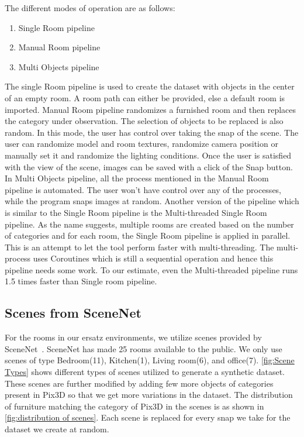 The different modes of operation are as follows:
\begin{enumerate}
\item Single Room pipeline
\item Manual Room pipeline
\item Multi Objects pipeline
\end{enumerate}

The single Room pipeline is used to create the dataset with objects in the center of an empty room.
A room path can either be provided, else a default room is imported.
Manual Room pipeline randomizes a furnished room and then replaces the category under observation.
The selection of objects to be replaced is also random.
In this mode, the user has control over taking the snap of the scene.
The user can randomize model and room textures, randomize camera position or manually set it and randomize the lighting conditions.
Once the user is satisfied with the view of the scene, images can be saved with a click of the Snap button.
In Multi Objects pipeline, all the process mentioned in the Manual Room pipeline is automated.
The user won’t have control over any of the processes, while the program snaps images at random.
Another version of the pipeline which is similar to the Single Room pipeline is the Multi-threaded Single Room pipeline.
As the name suggests, multiple rooms are created based on the number of categories and for each room, the Single Room pipeline is applied in parallel.
This is an attempt to let the tool perform faster with multi-threading.
The multi-process uses Coroutines which is still a sequential operation and hence this pipeline needs some work.
To our estimate, even the Multi-threaded pipeline runs 1.5 times faster than Single room pipeline.

\subsection{Scenes from SceneNet}\label{subsec:scenes-from-scenenet}
For the rooms in our ersatz environments, we utilize scenes provided by SceneNet~\cite{McCormac:etal:ICCV2017}.
SceneNet has made 25 rooms available to the public.
We only use scenes of type Bedroom(11), Kitchen(1), Living room(6), and office(7).
\autoref{fig:Scene Types} shows different types of scenes utilized to generate a synthetic dataset.
These scenes are further modified by adding few more objects of categories present in Pix3D so that we get more variations in the dataset.
The distribution of furniture matching the category of Pix3D in the scenes is as shown in \autoref{fig:distribution of scenes}.
Each scene is replaced for every snap we take for the dataset we create at random.


